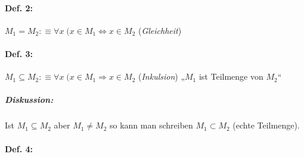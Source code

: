 \paragraph{Def. 2:} \parskp
$\boxed{M_1 = M_2} : \equiv \boxed{\forall x \; (x\in M_1 \Leftrightarrow x \in M_2}$ (\emph{Gleichheit})
\paragraph{Def. 3:} \parskp
$\boxed{M_1 \subseteq M_2} : \equiv \boxed{\forall x \; (x\in M_1 \Rightarrow x \in M_2}$ (\emph{Inkulsion}) „$M_1$ ist Teilmenge von $M_2$“

\subparagraph{Diskussion:} \parskp
Ist $M_1 \subseteq M_2$ aber $M_1\not = M_2$ so kann man schreiben $M_1\subset M_2$ (echte Teilmenge).

\paragraph{Def. 4:}
